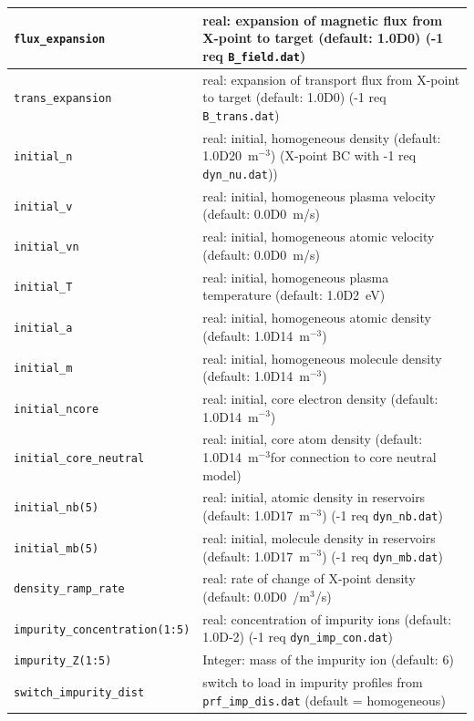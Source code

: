 \documentclass[amsmath,amssymb,a4]{revtex4-2}
\begin{document}
\begin{longtable}{| p{} | p{} |}
    {\tt flux\_expansion}         & real: expansion of magnetic flux from X-point to target (default: 1.0D0) (-1 req {\tt B\_field.dat})\\ \hline
    {\tt trans\_expansion}        & real: expansion of transport flux from X-point to target (default: 1.0D0) (-1 req {\tt B\_trans.dat})\\ \hline
    {\tt initial\_n}              & real: initial, homogeneous density (default: 1.0D20~m$^{-3}$) (X-point BC with -1 req {\tt dyn\_nu.dat})) \\ \hline
    {\tt initial\_v}              & real: initial, homogeneous plasma velocity (default: 0.0D0~m/s) \\ \hline
    {\tt initial\_vn}             & real: initial, homogeneous atomic velocity (default: 0.0D0~m/s) \\ \hline
    {\tt initial\_T}              & real: initial, homogeneous plasma temperature (default: 1.0D2~eV) \\ \hline
    {\tt initial\_a}              & real: initial, homogeneous atomic density (default: 1.0D14~m$^{-3}$) \\ \hline
    {\tt initial\_m}              & real: initial, homogeneous molecule density (default: 1.0D14~m$^{-3}$) \\ \hline
    {\tt initial\_ncore}          & real: initial, core electron density (default: 1.0D14~m$^{-3}$) \\ \hline
    {\tt initial\_core\_neutral}  & real: initial, core atom density (default: 1.0D14~m$^{-3}$for connection to core neutral model) \\ \hline
    {\tt initial\_nb(5)}          & real: initial, atomic density in reservoirs (default: 1.0D17~m$^{-3}$) (-1 req {\tt dyn\_nb.dat}) \\ \hline
    {\tt initial\_mb(5)}         & real: initial, molecule density in reservoirs (default: 1.0D17~m$^{-3}$)  (-1 req {\tt dyn\_mb.dat})  \\ \hline
     {\tt density\_ramp\_rate}    & real: rate of change of X-point density (default: 0.0D0~/m$^3$/s) \\ \hline
    {\tt impurity\_concentration(1:5)} & real: concentration of impurity ions (default: 1.0D-2) (-1 req {\tt dyn\_imp\_con.dat}) \\ \hline
    {\tt impurity\_Z(1:5)}      & Integer: mass of the impurity ion (default: 6) \\ \hline
    {\tt switch\_impurity\_dist}& switch to load in impurity profiles from {\tt prf\_imp\_dis.dat} (default = homogeneous) \\ \hline

\end{longtable}
\end{document}
